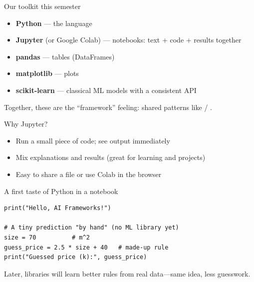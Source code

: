 \documentclass[aspectratio=169,11pt]{beamer}
\begin{document}
    \begin{frame}{Our toolkit this semester}
        \begin{itemize}
            \item \textbf{Python} --- the language
            \item \textbf{Jupyter} (or Google Colab) --- notebooks: text + code + results together
            \item \textbf{pandas} --- tables (DataFrames)
            \item \textbf{matplotlib} --- plots
            \item \textbf{scikit-learn} --- classical ML models with a consistent API
        \end{itemize}
        \vspace{0.5em}
        Together, these are the ``framework'' feeling: shared patterns like  / .
    \end{frame}

    \begin{frame}{Why Jupyter?}
        \begin{itemize}
            \item Run a small piece of code; see output immediately
            \item Mix explanations and results (great for learning and projects)
            \item Easy to share a  file or use Colab in the browser
        \end{itemize}
        \vspace{0.5em}
    \end{frame}

    \begin{frame}[fragile]{A first taste of Python in a notebook}
        \begin{lstlisting}
print("Hello, AI Frameworks!")

# A tiny prediction "by hand" (no ML library yet)
size = 70          # m^2
guess_price = 2.5 * size + 40   # made-up rule
print("Guessed price (k):", guess_price)
        \end{lstlisting}
        \vspace{0.3em}
        Later, libraries will learn better rules from real data---same idea, less guesswork.
    \end{frame}
\end{document}
